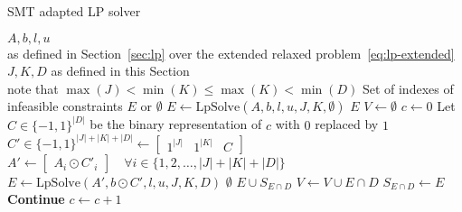 \begin{algorithm}
    \caption{SMT adapted LP solver}\label{alg:theory-solver}
    \begin{algorithmic}
        \Require $A, b, l, u$ \\
        \qquad as defined in Section~\ref{sec:lp} over the extended relaxed problem~\eqref{eq:lp-extended}
        \Require $J, K, D$ as defined in this Section \\
        \qquad note that $\max(J) < \min(K) \le \max(K) < \min(D)$
        \Ensure Set of indexes of infeasible constraints $E$ or $\emptyset$
        \State $E \gets \text{LpSolve}(A, b, l, u, J, K, \emptyset)$ 
        \State \Return $E$
        \EndIf
        \State $V \gets \emptyset$ 
        \State $c \gets 0$ 
        \State Let $C \in \{-1, 1\}^{|D|}$ be the binary representation of $c$ with $0$ replaced by $1$
        \State $C' \in \{-1, 1\}^{|J|+|K|+|D|} \gets \begin{bmatrix} 1^{|J|} & 1^{|K|} & C\end{bmatrix}$
        \State $A' \gets \begin{bmatrix}A_i \odot C'_i\end{bmatrix} \quad \forall i \in \{1, 2, \ldots, |J|+|K|+|D|\}$
        \State $E \gets \text{LpSolve}(A', b \odot C', l, u, J, K, D)$
        \State \Return $\emptyset$
         
        \State \Return $E \cup S_{E \cap D}$ 
        \EndIf
        \State $V \gets V \cup E \cap D$
        \State $S_{E \cap D} \gets E$
        \State \textbf{Continue}
        \EndIf
        \State $c \gets c + 1$
        \EndWhile
    \end{algorithmic}
\end{algorithm}
